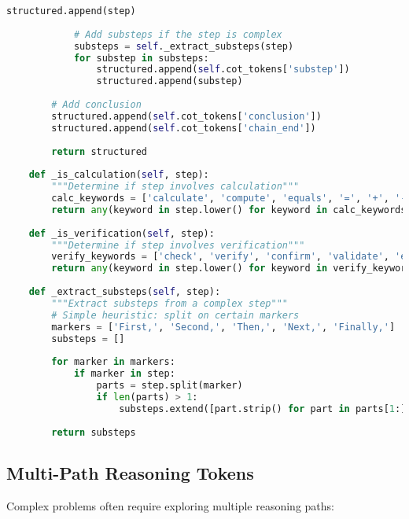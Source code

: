\begin{lstlisting}[language=Python, caption=Chain-of-thought step tokenization]
            structured.append(step)
            
            # Add substeps if the step is complex
            substeps = self._extract_substeps(step)
            for substep in substeps:
                structured.append(self.cot_tokens['substep'])
                structured.append(substep)
        
        # Add conclusion
        structured.append(self.cot_tokens['conclusion'])
        structured.append(self.cot_tokens['chain_end'])
        
        return structured
    
    def _is_calculation(self, step):
        """Determine if step involves calculation"""
        calc_keywords = ['calculate', 'compute', 'equals', '=', '+', '-', '*', '/']
        return any(keyword in step.lower() for keyword in calc_keywords)
    
    def _is_verification(self, step):
        """Determine if step involves verification"""
        verify_keywords = ['check', 'verify', 'confirm', 'validate', 'ensure']
        return any(keyword in step.lower() for keyword in verify_keywords)
    
    def _extract_substeps(self, step):
        """Extract substeps from a complex step"""
        # Simple heuristic: split on certain markers
        markers = ['First,', 'Second,', 'Then,', 'Next,', 'Finally,']
        substeps = []
        
        for marker in markers:
            if marker in step:
                parts = step.split(marker)
                if len(parts) > 1:
                    substeps.extend([part.strip() for part in parts[1:] if part.strip()])
        
        return substeps
\end{lstlisting}

\subsection{Multi-Path Reasoning Tokens}

Complex problems often require exploring multiple reasoning paths:

